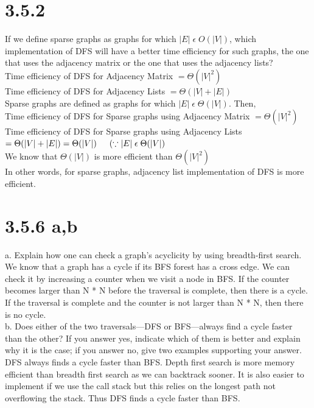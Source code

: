 \documentclass{article}
\begin{document}
\section{3.5.2}
If we define sparse graphs as graphs for which $|E| \; \epsilon \; O(|V|)$, which implementation of DFS will have a better time efficiency for such graphs, the one that uses the adjacency matrix or the one that uses the adjacency lists? \\
Time efficiency of DFS for Adjacency Matrix $= \Theta(\lvert V\rvert^2)$ \\
Time efficiency of DFS for Adjacency Lists $= \Theta(\lvert V\rvert + \lvert E \rvert)$ \\
Sparse graphs are defined as graphs for which $\lvert E\rvert \; \epsilon \; \Theta(\lvert V\rvert)$. Then, \\
Time efficiency of DFS for Sparse graphs using Adjacency Matrix $= \Theta(\lvert V\rvert^2)$ \\
Time efficiency of DFS for Sparse graphs using Adjacency Lists $= \Theta(\lvert V\rvert + \lvert E \rvert) = \Theta(\lvert V \rvert) \indent (\because \lvert E\rvert \; \epsilon \; \Theta(\lvert V\rvert)$ \\
We know that $\Theta(\lvert V\rvert)$ is more efficient than $\Theta(\lvert V\rvert^2)$ \\
In other words, for sparse graphs, adjacency list implementation of DFS is more efficient.

\section{3.5.6 a,b}
a. Explain how one can check a graph’s acyclicity by using breadth-first search. \\
\indent We know that a graph has a cycle if its BFS forest has a cross edge. We can check it by increasing a counter when we visit a node in BFS. If the counter becomes larger than N * N before the traversal is complete, then there is a cycle. If the traversal is complete and the counter is not larger than N * N, then there is no cycle. \\
b. Does either of the two traversals—DFS or BFS—always find a cycle faster than the other? If you answer yes, indicate which of them is better and explain why it is the case; if you answer no, give two examples supporting your answer. \\
\indent DFS always finds a cycle faster than BFS. Depth first search is more memory efficient than breadth first search as we can backtrack sooner. It is also easier to implement if we use the call stack but this relies on the longest path not overflowing the stack. Thus DFS finds a cycle faster than BFS.
\end{document}
